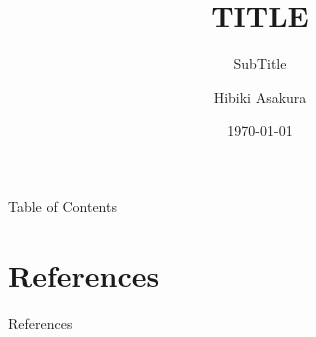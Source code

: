 \documentclass[unicode,9pt]{beamer}%
\title[short title]{TITLE}
\subtitle{SubTitle}
\author[H.Asakura]{Hibiki Asakura}
\institute[Kyoto U.]{Kyoto University}
\date{\today}
\begin{document}
\begin{frame}[noframenumbering]
  \titlepage
\end{frame}

\begin{frame}{Table of Contents}
  \tableofcontents[hideallsubsections]
\end{frame}




\section*{References}

\begin{frame}{References}
  \renewcommand{\refname}{References}
  
\end{frame}

\beginbackup

\backupend
\end{document}

